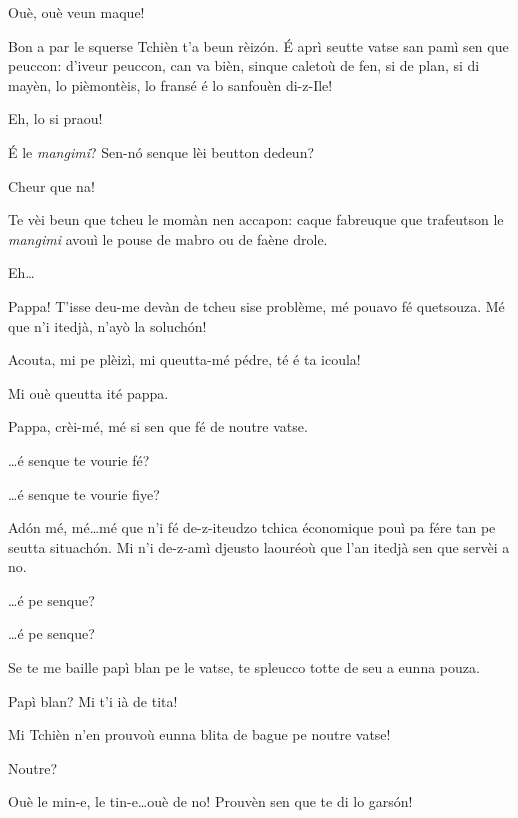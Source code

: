 \begin{drama}
\Mariettospeaks Ouè, ouè veun maque!


\Mariettospeaks Bon a par le squerse Tchièn t’a beun rèiz\'on. \'E aprì seutte vatse san pamì sen que peuccon: d’iveur peuccon, can va bièn, sinque caletoù de fen, si de plan, si di mayèn, lo pièmontèis, lo fransé é lo sanfouèn di-z-Ile!


\Cienspeaks {} Eh, lo si praou!

\Mariettospeaks \'E le \textit{mangimi}? Sen-n\'o senque lèi beutton dedeun?

\Cienspeaks Cheur que na!

\Mariettospeaks Te vèi beun que tcheu le momàn nen accapon: caque fabreuque que trafeutson le \textit{mangimi} avouì le pouse de mabro ou de faène drole.

\Cienspeaks {} Eh\ldots 

\Simonspeaks {} Pappa!  T’isse deu-me devàn de tcheu sise problème, mé pouavo fé quetsouza. Mé que n'i itedjà, n'ayò la soluch\'on!

\Cienspeaks Acouta, mi pe plèizì, mi queutta-mé pédre, té é ta icoula!

\Mariettospeaks Mi ouè queutta ité pappa.

\Simonspeaks Pappa, crèi-mé, mé si sen que fé de noutre vatse.

\Cienspeaks \ldots é senque te vourie fé?

\Mariettospeaks \ldots é senque te vourie fiye?

\Simonspeaks Ad\'on mé, mé\ldots mé que n'i fé de-z-iteudzo tchica économique pouì pa fére tan pe seutta situach\'on. Mi n’i de-z-amì djeusto laouréoù que l’an itedjà sen que servèi a no.

\Cienspeaks \ldots é pe senque?

\Mariettospeaks \ldots é pe senque?

\Simonspeaks Se te me baille papì blan pe le vatse, te spleucco totte de seu a eunna pouza.

\Cienspeaks Papì blan? Mi t'i ià de tita!

\Mariettospeaks Mi Tchièn n’en prouvoù eunna blita de bague pe noutre vatse! 

\Cienspeaks Noutre? \doute

\Mariettospeaks  Ouè le min-e, le tin-e\ldots ouè de no! Prouvèn sen que te di lo gars\'on!


\end{drama}

